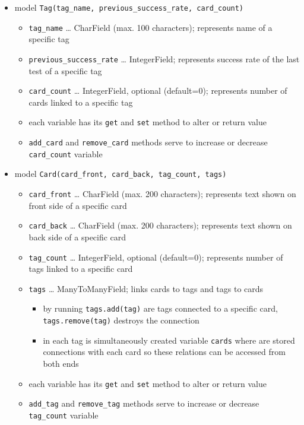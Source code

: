 \documentclass[12pt]{article}
\providecommand{\tightlist}{\setlength{\itemsep}{1pt}\setlength{\parskip}{1pt}}
\let\oldtexttt\texttt
\renewcommand{\texttt}[1]{\oldtexttt{\textcolor{codehighlight}{#1}}}
\begin{document}
\begin{itemize}
\tightlist
\item
  model \texttt{Tag(tag\_name,\ previous\_success\_rate,\ card\_count)}

  \begin{itemize}
  \tightlist
  \item
    \texttt{tag\_name} \ldots{} CharField (max. 100 characters);
    represents name of a specific tag
  \item
    \texttt{previous\_success\_rate} \ldots{} IntegerField; represents
    success rate of the last test of a specific tag
  \item
    \texttt{card\_count} \ldots{} IntegerField, optional (default=0);
    represents number of cards linked to a specific tag
  \item
    each variable has its \texttt{get} and \texttt{set} method to alter
    or return value
  \item
    \texttt{add\_card} and \texttt{remove\_card} methods serve to
    increase or decrease \texttt{card\_count} variable
  \end{itemize}
\item
  model \texttt{Card(card\_front,\ card\_back,\ tag\_count,\ tags)}

  \begin{itemize}
  \tightlist
  \item
    \texttt{card\_front} \ldots{} CharField (max. 200 characters);
    represents text shown on front side of a specific card
  \item
    \texttt{card\_back} \ldots{} CharField (max. 200 characters);
    represents text shown on back side of a specific card
  \item
    \texttt{tag\_count} \ldots{} IntegerField, optional (default=0);
    represents number of tags linked to a specific card
  \item
    \texttt{tags} \ldots{} ManyToManyField; links cards to tags and tags
    to cards

    \begin{itemize}
    \tightlist
    \item
      by running \texttt{tags.add(tag)} are tags connected to a specific
      card, \texttt{tags.remove(tag)} destroys the connection
    \item
      in each tag is simultaneously created variable \texttt{cards}
      where are stored connections with each card so these relations can
      be accessed from both ends
    \end{itemize}
  \item
    each variable has its \texttt{get} and \texttt{set} method to alter
    or return value
  \item
    \texttt{add\_tag} and \texttt{remove\_tag} methods serve to increase
    or decrease \texttt{tag\_count} variable
  \end{itemize}
\end{itemize}
\end{document}
